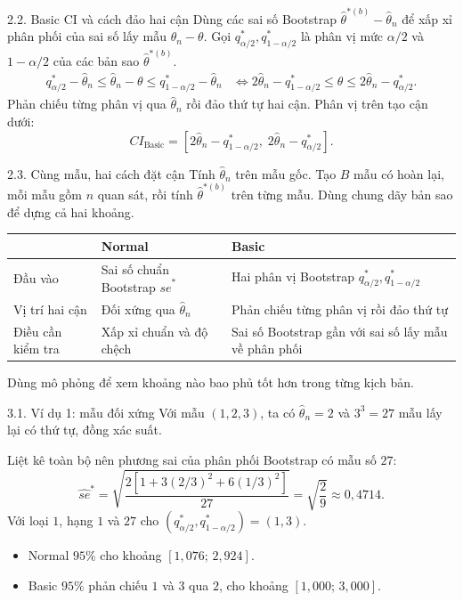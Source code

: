 \documentclass[aspectratio=43,10pt]{beamer}
\begin{document}
\begin{frame}{2.2. Basic CI và cách đảo hai cận}
    Dùng các sai số Bootstrap $\hat\theta^{*(b)}-\hat\theta_n$ để xấp xỉ phân phối của sai số lấy mẫu $\hat\theta_n-\theta$.
    Gọi $q_{\alpha/2}^*,q_{1-\alpha/2}^*$ là phân vị mức $\alpha/2$ và $1-\alpha/2$ của các bản sao $\hat\theta^{*(b)}$.
    \[
    \begin{aligned}
    q_{\alpha/2}^*-\hat\theta_n\le \hat\theta_n-\theta\le q_{1-\alpha/2}^*-\hat\theta_n
    &\iff 2\hat\theta_n-q_{1-\alpha/2}^*\le\theta\le 2\hat\theta_n-q_{\alpha/2}^*.
    \end{aligned}
    \]
    Phản chiếu từng phân vị qua $\hat\theta_n$ rồi đảo thứ tự hai cận. Phân vị trên tạo cận dưới:
    \[
    CI_{\text{Basic}}=\left[2\hat\theta_n-q_{1-\alpha/2}^*,\;2\hat\theta_n-q_{\alpha/2}^*\right].
    \]
\end{frame}

\begin{frame}{2.3. Cùng mẫu, hai cách đặt cận}
    Tính $\hat\theta_n$ trên mẫu gốc. Tạo $B$ mẫu có hoàn lại, mỗi mẫu gồm $n$ quan sát, rồi tính $\hat\theta^{*(b)}$ trên từng mẫu. Dùng chung dãy bản sao để dựng cả hai khoảng.
    \medskip

    \centering\small
    \begin{tabular}{l>{\raggedright\arraybackslash}p{3.8cm}>{\raggedright\arraybackslash}p{4.1cm}}
    \toprule & Normal & Basic\\ \midrule
    Đầu vào & Sai số chuẩn Bootstrap $\widehat{se}^*$ & Hai phân vị Bootstrap $q_{\alpha/2}^*, q_{1-\alpha/2}^*$\\
    Vị trí hai cận & Đối xứng qua $\hat\theta_n$ & Phản chiếu từng phân vị rồi đảo thứ tự\\
    Điều cần kiểm tra & Xấp xỉ chuẩn và độ chệch & Sai số Bootstrap gần với sai số lấy mẫu về phân phối\\ \bottomrule
    \end{tabular}\par
    \medskip\raggedright
    Dùng mô phỏng để xem khoảng nào bao phủ tốt hơn trong từng kịch bản.
\end{frame}

\begin{frame}{3.1. Ví dụ 1: mẫu đối xứng}
    Với mẫu $(1,2,3)$, ta có $\hat\theta_n=2$ và $3^3=27$ mẫu lấy lại có thứ tự, đồng xác suất.
    \medskip

    Liệt kê toàn bộ nên phương sai của phân phối Bootstrap có mẫu số $27$:
    \[
    \widehat{se}^*=\sqrt{\frac{2[1+3(2/3)^2+6(1/3)^2]}{27}}
    =\sqrt{\frac{2}{9}}\approx0{,}4714.
    \]
    Với loại $1$, hạng $1$ và $27$ cho $(q_{\alpha/2}^*,q_{1-\alpha/2}^*)=(1,3)$.
    \begin{itemize}
        \item Normal $95\%$ cho khoảng $[1{,}076;\,2{,}924]$.
        \item Basic $95\%$ phản chiếu $1$ và $3$ qua $2$, cho khoảng $[1{,}000;\,3{,}000]$.
    \end{itemize}
\end{frame}
\end{document}
